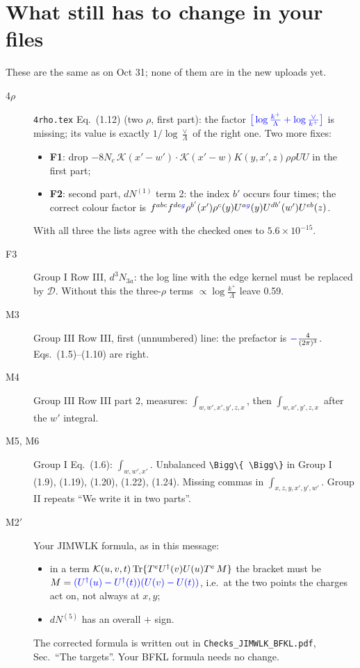 \documentclass[10pt]{article}
\newcommand{\new}[1]{{\color{blue}#1}}
\newcommand{\old}[1]{{\color{red}\sout{#1}}}
\begin{document}
\section{What still has to change in your files}
These are the same as on Oct 31; none of them are in the new uploads yet.
\begin{description}
\item[4$\rho$] \texttt{4rho.tex} Eq.~(1.12) (two $\rho$, first part): the factor $\new{\big[\log\frac{k^+}{\Lambda}+\log\frac{\vee}{k^+}\big]}$ is missing; its value is exactly $1/\log\frac{\vee}{\Lambda}$ of the right one. Two more fixes:
\begin{itemize}
\item \textbf{F1}: drop \old{$-8N_c\,\mathcal K(x'-w')\cdot\mathcal K(x'-w)K(y,x',z)\rho\rho UU$} in the first part;
\item \textbf{F2}: second part, $dN^{(1)}$ term 2: the index $b'$ occurs four times; the correct colour factor is $f^{abc}f^{de\new{g}}\rho^{b'}(x')\rho^c(y)U^{a\new g}(y)U^{db'}(w')U^{eb}(z)$.
\end{itemize}
With all three the lists agree with the checked ones to $5.6\times10^{-15}$.
\item[F3] Group I Row III, $d^3N_{3a}$: the log line with the edge kernel must be replaced by $\mathcal D$. Without this the three-$\rho$ terms $\propto\log\frac{k^+}{\Lambda}$ leave 0.59.
\item[M3] Group III Row III, first (unnumbered) line: the prefactor is $\new{-}\frac{4}{(2\pi)^3}$. Eqs.~(1.5)--(1.10) are right.
\item[M4] Group III Row III part 2, measures: $\int_{w,w',x',y',z,x}$, then $\int_{w,x',y',z,x}$ after the $w'$ integral.
\item[M5, M6] Group I Eq.~(1.6): $\int_{w,w',x'}$. Unbalanced \verb|\Bigg\{ \Bigg\}| in Group I (1.9), (1.19), (1.20), (1.22), (1.24). Missing commas in $\int_{x,z,y,x',y',w'}$. Group II repeats ``We write it in two parts''.
\item[M2$'$] Your JIMWLK formula, as in this message:
\begin{itemize}
\item in a term $\mathcal K(u,v,t)\,{\rm Tr}\{T^eU^\dagger(v)U(u)T^e\,M\}$ the bracket must be $M=\new{(U^\dagger(u)-U^\dagger(t))(U(v)-U(t))}$, i.e.\ at the two points the charges act on, not always at $x,y$;
\item $dN^{(5)}$ has an overall \new{$+$} sign.
\end{itemize}
The corrected formula is written out in \texttt{Checks\_JIMWLK\_BFKL.pdf}, Sec.~``The targets''. Your BFKL formula needs no change.
\end{description}
\end{document}
